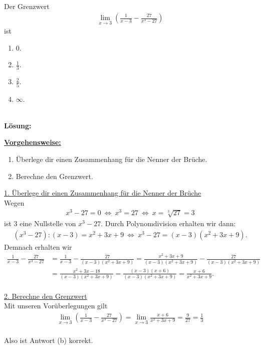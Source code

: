 \subsection*{}
Der Grenzwert
\begin{align*}
\lim \limits_{x \to 3} 
\left(\frac{1}{x-3} - \frac{27}{x^3 - 27}\right)
\end{align*}
ist
\renewcommand{\labelenumi}{(\alph{enumi})}
\begin{enumerate}
	\item 
	$ 0 $.
	\item
	$ \frac{1}{3} $.
	\item
	$ \frac{2}{5} $.
	\item
	$ \infty $.
\end{enumerate}
\ \\
\textbf{Lösung:}
\begin{mdframed}
\underline{\textbf{Vorgehensweise:}}
\renewcommand{\labelenumi}{\theenumi.}
\begin{enumerate}
\item Überlege dir einen Zusammenhang für die Nenner der Brüche.
\item Berechne den Grenzwert. 
\end{enumerate}
\end{mdframed}

\underline{1. Überlege dir einen Zusammenhang für die Nenner der Brüche}\\
Wegen
\begin{align*}
x^3 - 27 = 0 \ \Leftrightarrow  \
x^3 = 27 \ \Leftrightarrow \
x = \sqrt[3]{27} = 3
\end{align*}
ist $ 3  $ eine Nullstelle von $ x^3 - 27 $. Durch Polynomdivision erhalten wir dann:
\begin{align*}
(x^3 - 27) : (x-3) = x^2 + 3x + 9
\ \Leftrightarrow \
x^3 - 27 = ( x-3)(x^2 +3x +9).
\end{align*}
Demnach erhalten wir 
\begin{align*}
\frac{1}{x-3} - \frac{27}{x^3 -27}
&=
\frac{1}{x-3} - \frac{27}{( x-3)(x^2 +3x +9)}
=
\frac{x^2 +3x +9}{( x-3)(x^2 +3x +9)} - \frac{27}{( x-3)(x^2 +3x +9)}\\
&=
\frac{x^2 +3x -18}{( x-3)(x^2 +3x +9)}
=
\frac{(x-3)(x+6)}{( x-3)(x^2 +3x +9)}
=
\frac{x+6}{x^2 +3x +9}.
\end{align*}
\\

\underline{2. Berechne den Grenzwert}\\
Mit unseren Vorüberlegungen gilt
\begin{align*}
\lim \limits_{x \to 3} 
\left(\frac{1}{x-3} - \frac{27}{x^3 - 27}\right)
=
\lim \limits_{x \to 3} 
\frac{x+6}{x^2 +3x +9}
=
\frac{9}{27} = \frac{1}{3}
\end{align*}
\ \\
Also ist Antwort (b) korrekt.
\newpage
